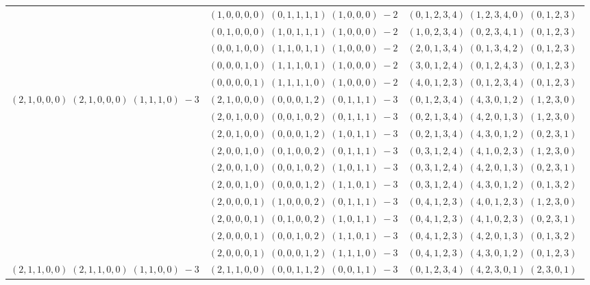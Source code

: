 \documentclass[11pt]{article}
\begin{document}
\begin{longtable}[l]{|c|c|c|}
 \cline{2-3} 
 & $(1 ,0 ,0 ,0 ,0) \;(0 ,1 ,1 ,1 ,1) \;(1 ,0 ,0 ,0) \;-2$ & $(0 ,1 ,2 ,3 ,4) \;(1 ,2 ,3 ,4 ,0) \;(0 ,1 ,2 ,3) \;$\\ 
 \cline{2-3} 
 & $(0 ,1 ,0 ,0 ,0) \;(1 ,0 ,1 ,1 ,1) \;(1 ,0 ,0 ,0) \;-2$ & $(1 ,0 ,2 ,3 ,4) \;(0 ,2 ,3 ,4 ,1) \;(0 ,1 ,2 ,3) \;$\\ 
 \cline{2-3} 
 & $(0 ,0 ,1 ,0 ,0) \;(1 ,1 ,0 ,1 ,1) \;(1 ,0 ,0 ,0) \;-2$ & $(2 ,0 ,1 ,3 ,4) \;(0 ,1 ,3 ,4 ,2) \;(0 ,1 ,2 ,3) \;$\\ 
 \cline{2-3} 
 & $(0 ,0 ,0 ,1 ,0) \;(1 ,1 ,1 ,0 ,1) \;(1 ,0 ,0 ,0) \;-2$ & $(3 ,0 ,1 ,2 ,4) \;(0 ,1 ,2 ,4 ,3) \;(0 ,1 ,2 ,3) \;$\\ 
 \cline{2-3} 
 & $(0 ,0 ,0 ,0 ,1) \;(1 ,1 ,1 ,1 ,0) \;(1 ,0 ,0 ,0) \;-2$ & $(4 ,0 ,1 ,2 ,3) \;(0 ,1 ,2 ,3 ,4) \;(0 ,1 ,2 ,3) \;$\\ \hline\multirow[t]{10}{*}{ $(2 ,1 ,0 ,0 ,0) \;(2 ,1 ,0 ,0 ,0) \;(1 ,1 ,1 ,0) \;-3$ }  & $(2 ,1 ,0 ,0 ,0) \;(0 ,0 ,0 ,1 ,2) \;(0 ,1 ,1 ,1) \;-3$ & $(0 ,1 ,2 ,3 ,4) \;(4 ,3 ,0 ,1 ,2) \;(1 ,2 ,3 ,0) \;$\\ 
 \cline{2-3} 
 & $(2 ,0 ,1 ,0 ,0) \;(0 ,0 ,1 ,0 ,2) \;(0 ,1 ,1 ,1) \;-3$ & $(0 ,2 ,1 ,3 ,4) \;(4 ,2 ,0 ,1 ,3) \;(1 ,2 ,3 ,0) \;$\\ 
 \cline{2-3} 
 & $(2 ,0 ,1 ,0 ,0) \;(0 ,0 ,0 ,1 ,2) \;(1 ,0 ,1 ,1) \;-3$ & $(0 ,2 ,1 ,3 ,4) \;(4 ,3 ,0 ,1 ,2) \;(0 ,2 ,3 ,1) \;$\\ 
 \cline{2-3} 
 & $(2 ,0 ,0 ,1 ,0) \;(0 ,1 ,0 ,0 ,2) \;(0 ,1 ,1 ,1) \;-3$ & $(0 ,3 ,1 ,2 ,4) \;(4 ,1 ,0 ,2 ,3) \;(1 ,2 ,3 ,0) \;$\\ 
 \cline{2-3} 
 & $(2 ,0 ,0 ,1 ,0) \;(0 ,0 ,1 ,0 ,2) \;(1 ,0 ,1 ,1) \;-3$ & $(0 ,3 ,1 ,2 ,4) \;(4 ,2 ,0 ,1 ,3) \;(0 ,2 ,3 ,1) \;$\\ 
 \cline{2-3} 
 & $(2 ,0 ,0 ,1 ,0) \;(0 ,0 ,0 ,1 ,2) \;(1 ,1 ,0 ,1) \;-3$ & $(0 ,3 ,1 ,2 ,4) \;(4 ,3 ,0 ,1 ,2) \;(0 ,1 ,3 ,2) \;$\\ 
 \cline{2-3} 
 & $(2 ,0 ,0 ,0 ,1) \;(1 ,0 ,0 ,0 ,2) \;(0 ,1 ,1 ,1) \;-3$ & $(0 ,4 ,1 ,2 ,3) \;(4 ,0 ,1 ,2 ,3) \;(1 ,2 ,3 ,0) \;$\\ 
 \cline{2-3} 
 & $(2 ,0 ,0 ,0 ,1) \;(0 ,1 ,0 ,0 ,2) \;(1 ,0 ,1 ,1) \;-3$ & $(0 ,4 ,1 ,2 ,3) \;(4 ,1 ,0 ,2 ,3) \;(0 ,2 ,3 ,1) \;$\\ 
 \cline{2-3} 
 & $(2 ,0 ,0 ,0 ,1) \;(0 ,0 ,1 ,0 ,2) \;(1 ,1 ,0 ,1) \;-3$ & $(0 ,4 ,1 ,2 ,3) \;(4 ,2 ,0 ,1 ,3) \;(0 ,1 ,3 ,2) \;$\\ 
 \cline{2-3} 
 & $(2 ,0 ,0 ,0 ,1) \;(0 ,0 ,0 ,1 ,2) \;(1 ,1 ,1 ,0) \;-3$ & $(0 ,4 ,1 ,2 ,3) \;(4 ,3 ,0 ,1 ,2) \;(0 ,1 ,2 ,3) \;$\\ \hline\multirow[t]{21}{*}{ $(2 ,1 ,1 ,0 ,0) \;(2 ,1 ,1 ,0 ,0) \;(1 ,1 ,0 ,0) \;-3$ }  & $(2 ,1 ,1 ,0 ,0) \;(0 ,0 ,1 ,1 ,2) \;(0 ,0 ,1 ,1) \;-3$ & $(0 ,1 ,2 ,3 ,4) \;(4 ,2 ,3 ,0 ,1) \;(2 ,3 ,0 ,1) \;$\\ 

\end{longtable}
\end{document}
